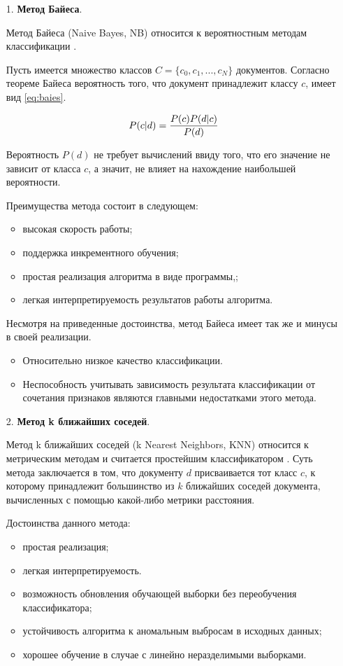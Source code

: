 \begin{enumerate}
\item[1.] \textbf{Метод Байеса}.

Метод Байеса (Naive Bayes, NB) относится к вероятностным методам классификации \cite{baes}. 

Пусть имеется множество классов $C = \{c_0, c_1, ..., c_N\}$ документов. Согласно теореме Байеса вероятность того, что документ принадлежит классу $c$, имеет вид \ref{eq:baies}.

\begin{equation}
	\centering
	P(c|d)=\frac{P(c)P(d|c)}{P(d)}
	\label{eq:baies}
\end{equation}

Вероятность $P(d)$ не требует вычислений ввиду того, что его значение не зависит от класса $c$, а значит, не влияет на нахождение наибольшей вероятности. 

Преимущества метода состоит в следующем: 
\begin{itemize}
\item высокая скорость работы;
\item поддержка инкрементного обучения;
\item простая реализация алгоритма в виде программы,;
\item легкая интерпретируемость результатов работы алгоритма. 
\end{itemize}

Несмотря на приведенные достоинства, метод Байеса имеет так же и минусы в своей реализации. 
\begin{itemize}
\item Относительно низкое качество классификации. 
\item Неспособность учитывать зависимость результата классификации от сочетания признаков являются главными недостатками этого метода.
\end{itemize}

\item[2.] \textbf{Метод k ближайших соседей}.

Метод k ближайших соседей (k Nearest Neighbors, KNN) относится к метрическим методам и считается простейшим классификатором \cite{neighbors}. Суть метода заключается в том, что документу $d$ присваивается тот класс $c$, к которому принадлежит большинство из $k$ ближайших соседей документа, вычисленных с помощью какой-либо метрики расстояния.

Достоинства данного метода: 
\begin{itemize}
\item простая реализация;
\item легкая интерпретируемость.
\item возможность обновления обучающей выборки без переобучения классификатора; 
\item устойчивость алгоритма к аномальным выбросам в исходных данных; 
\item хорошее обучение в случае с линейно неразделимыми выборками.
\end{itemize}


\end{enumerate}

